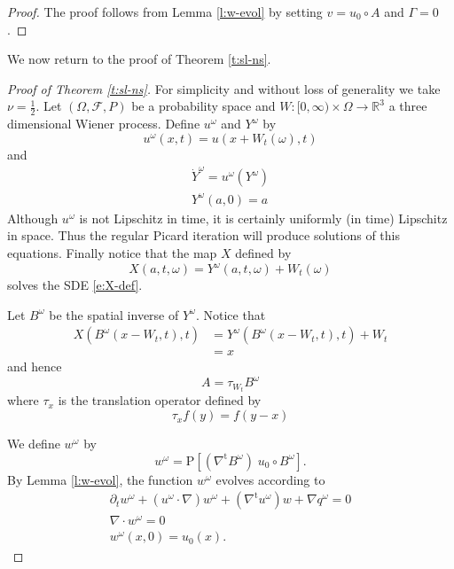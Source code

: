 \documentclass[final]{amsart}%
\newcommand{\snseqns}{\eqref{e:X-def}--\eqref{e:X-idata}}
\newcommand{\del}{\partial}
\newcommand{\transpose}{^\text{t}}
\newcommand{\grad}{\nabla}
\newcommand{\gradt}{\grad\transpose}
\newcommand{\divergence}{\grad \cdot}
\newcommand{\womega}{{w^\omega}}
\newcommand{\lhp}{\boldsymbol{\mathrm{P}}}
\newcommand{\R}{\mathbb{R}}
\numberwithin{equation}{section}
\theoremstyle{definition}
\theoremstyle{remark}
\begin{document}
\begin{proof}%
The proof follows from Lemma \ref{l:w-evol} by setting $v=u_0 \circ A$ and $\Gamma = 0$.
\end{proof}

We now return to the proof of Theorem \ref{t:sl-ns}.
\begin{proof}[Proof of Theorem \ref{t:sl-ns}]%

For simplicity and without loss of generality we take $\nu = \frac{1}{2}$. Let $(\Omega, \mathcal{F}, P)$ be a probability space and $W:[0,\infty) \times \Omega \to \R^3$ a three dimensional Wiener process. Define $u^\omega$ and $Y^\omega$ by
\begin{equation*}
u^\omega(x,t) = u(x + W_t(\omega), t)
\end{equation*}
and
\begin{gather*}
\dot{Y}^\omega = u^\omega(Y^\omega)\\
Y^\omega(a,0) = a
\end{gather*}
Although $u^\omega$ is not Lipschitz in time, it is certainly uniformly (in time) Lipschitz in space. Thus the regular Picard iteration will produce solutions of this equations. Finally notice that the map $X$ defined by
\begin{equation*}
X(a, t, \omega) = Y^\omega(a, t, \omega) + W_t(\omega)
\end{equation*}
solves the SDE \eqref{e:X-def}.

Let $B^\omega$ be the spatial inverse of $Y^\omega$. Notice that
\begin{align*}
X(B^\omega(x - W_t, t), t) &= Y^\omega( B^\omega(x - W_t, t), t) + W_t\\
    &= x
\end{align*}
and hence
\begin{equation}
A = \tau_{W_t} B^\omega
\end{equation}
where $\tau_x$ is the translation operator defined by
\begin{equation}
\tau_x f (y) = f(y - x)
\end{equation}

We define $\womega$ by
\begin{equation*}
\womega = \lhp\left[ (\gradt B^\omega) \; u_0 \circ B^\omega \right].
\end{equation*}
By Lemma \ref{l:w-evol},  the function $\womega$ evolves according to
\begin{gather}
\label{e:womega-evol} \del_t \womega + (u^\omega \cdot \grad) \womega + (\gradt u^\omega) w + \grad q^\omega = 0\\
\label{e:womega-dfree} \divergence \womega = 0\\
\label{e:womega-idata} \womega(x,0) = u_0(x).
\end{gather}


\end{proof}
\end{document}
